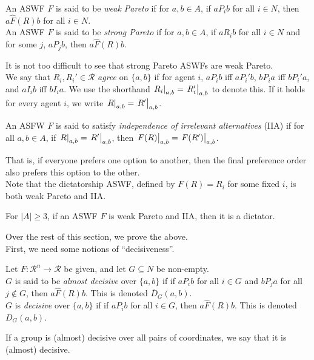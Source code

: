 	\begin{fdef}[Pareto]
		An ASWF $F$ is said to be \emph{weak Pareto} if for $a,b \in A$, if $a P_i b$ for all $i \in N$, then $a \hat{F}(R) b$ for all $i \in N$.\\ %
		An ASWF $F$ is said to be \emph{strong Pareto} if for $a,b \in A$, if $a R_i b$ for all $i \in N$ and for some $j$, $a P_j b$, then $a \hat{F}(R) b$.
	\end{fdef}

	It is not too difficult to see that strong Pareto ASWFs are weak Pareto.\\
	We say that $R_i,R_i'\in\mathcal{R}$ \emph{agree} on $\{a,b\}$ if for agent $i$, $a P_i b$ iff $a P_i' b$, $b P_i a$ iff $b P_i' a$, and $a I_i b$ iff $b I_i a$. We use the shorthand $\left.R_i\right|_{a,b} = \left.R_i'\right|_{a,b}$ to denote this. If it holds for every agent $i$, we write $\left.R\right|_{a,b} = \left.R'\right|_{a,b}$.

	\begin{fdef}
		An ASFW $F$ is said to satisfy \emph{independence of irrelevant alternatives} (IIA) if for all $a,b \in A$, if $\left.R\right|_{a,b} = \left.R'\right|_{a,b}$, then $\left.F(R)\right|_{a,b} = \left.F(R')\right|_{a,b}$.
	\end{fdef}
	That is, if everyone prefers one option to another, then the final preference order also prefers this option to the other.\\
	Note that the dictatorship ASWF, defined by $F(R) = R_i$ for some fixed $i$, is both weak Pareto and IIA.

	\begin{ftheo}[Arrow]
		\label{arrow}
		For $|A| \ge 3$, if an ASWF $F$ is weak Pareto and IIA, then it is a dictator.
	\end{ftheo}

	Over the rest of this section, we prove the above.\\
	First, we need some notions of ``decisiveness''.

	\begin{fdef}
		Let $F : \mathcal{R}^n \to \mathcal{R}$ be given, and let $G \subseteq N$ be non-empty.\\
		$G$ is said to be \emph{almost decisive} over $\{a,b\}$ if if $a P_i b$ for all $i \in G$ and $b P_j a$ for all $j \not\in G$, then $a \hat{F}(R) b$. This is denoted $\overline{D}_G(a,b)$. \\
		$G$ is \emph{decisive} over $\{a,b\}$ if if $a P_i b$ for all $i \in G$, then $a \hat{F}(R) b$. This is denoted $D_G(a,b)$.
	\end{fdef}
	If a group is (almost) decisive over all pairs of coordinates, we say that it is (almost) decisive.

